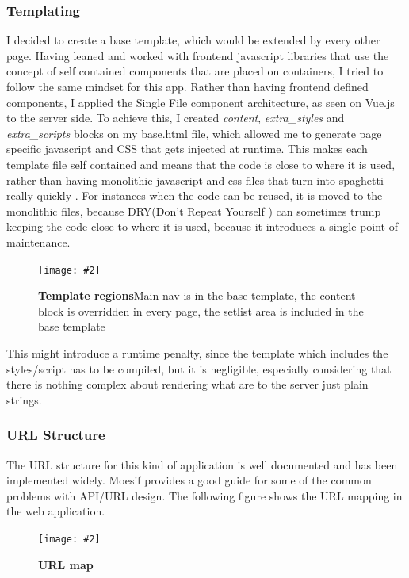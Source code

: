 \documentclass[10pt, a4paper]{article}
\newcommand{\figuremacro}[5]{
    \begin{figure}[#1]
        \centering
        \texttt{[image: \#2]}
        \caption[#3]{\textbf{#3}#4}
        \label{fig:#2}
    \end{figure}
}
\begin{document}
    \subsubsection{Templating}
    I decided to create a base template, which would be extended by every other page. Having leaned and worked with frontend javascript libraries that use the concept of self contained components that are placed on containers\cite{abramov_presentational_2015}, I tried to follow the same mindset for this app.
    Rather than having frontend defined components, I applied the Single File component architecture, as seen on Vue.js \cite{Vue.js} to the server side.
    To achieve this, I created \textit{content}, \textit{extra\_styles} and \textit{extra\_scripts} blocks on my base.html file, which allowed me to generate page specific javascript and CSS that gets injected at runtime. This makes each template file self contained and means that the code is close to where it is used, rather than having monolithic javascript and css files that turn into spaghetti really quickly \cite{conway1978a}. For instances when the code can be reused, it is moved to the monolithic files, because DRY(Don't Repeat Yourself \cite{hunt2000the}) can sometimes trump keeping the code close to where it is used, because it introduces a single point of maintenance.
    
    \figuremacro{h}{regions}{Template regions}{Main nav is in the base template, the content block is overridden in every page, the setlist area is included in the base template}{1.0}
    
    This might introduce a runtime penalty, since the template which includes the styles/script has to be compiled, but it is negligible, especially considering that there is nothing complex about rendering what are to the server just plain strings.
    
    \subsubsection{URL Structure}
    The URL structure for this kind of application is well documented and has been implemented widely. Moesif\cite{Moesif} provides a good guide for some of the common problems with API/URL design.
    The following figure shows the URL mapping in the web application.
    
    \figuremacro{h}{url-map}{URL map}{}{1.0}
	
\end{document}
